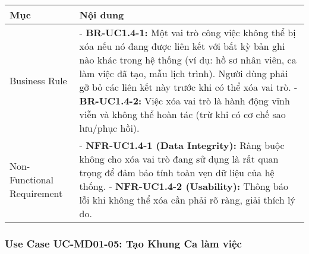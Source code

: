 \begin{longtable}{|m{4cm}|p{11cm}|}
\hline
\textbf{Mục} & \textbf{Nội dung} \\
\hline
Business Rule & - \textbf{BR-UC1.4-1:} Một vai trò công việc không thể bị xóa nếu nó đang được liên kết với bất kỳ bản ghi nào khác trong hệ thống (ví dụ: hồ sơ nhân viên, ca làm việc đã tạo, mẫu lịch trình). Người dùng phải gỡ bỏ các liên kết này trước khi có thể xóa vai trò. \newline - \textbf{BR-UC1.4-2:} Việc xóa vai trò là hành động vĩnh viễn và không thể hoàn tác (trừ khi có cơ chế sao lưu/phục hồi). \\
\hline
Non-Functional Requirement & - \textbf{NFR-UC1.4-1 (Data Integrity):} Ràng buộc không cho xóa vai trò đang sử dụng là rất quan trọng để đảm bảo tính toàn vẹn dữ liệu của hệ thống. \newline - \textbf{NFR-UC1.4-2 (Usability):} Thông báo lỗi khi không thể xóa cần phải rõ ràng, giải thích lý do. \\
\hline
\end{longtable}

\subsubsection{Use Case UC-MD01-05: Tạo Khung Ca làm việc}

